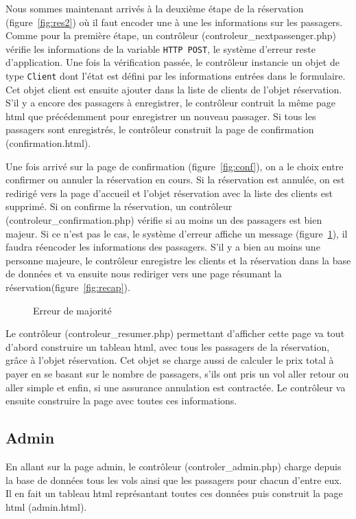 \documentclass[12pt,a4paper]{article}
\begin{document}
			Nous sommes maintenant arrivés à la deuxième étape de la réservation (figure~\ref{fig:res2}) où il faut encoder une à une les informations sur les passagers. Comme pour la première étape, un contrôleur (controleur\_nextpassenger.php) vérifie les informations de la variable \texttt{HTTP POST}, le système d'erreur reste d'application. Une fois la vérification passée, le contrôleur instancie un objet de type \texttt{Client} dont l'état est défini par les informations entrées dans le formulaire. Cet objet client est ensuite ajouter dans la liste de clients de l'objet réservation. S'il y a encore des passagers à enregistrer, le contrôleur contruit la même page html que précédemment pour enregistrer un nouveau passager. Si tous les passagers sont enregistrés, le contrôleur construit la page de confirmation (confirmation.html).

			Une fois arrivé sur la page de confirmation (figure~\ref{fig:conf}), on a le choix entre confirmer ou annuler la réservation en cours. Si la réservation est annulée, on est redirigé vers la page d'accueil et l'objet réservation avec la liste des clients est supprimé. Si on confirme la réservation, un contrôleur (controleur\_confirmation.php) vérifie si au moins un des passagers est bien majeur. Si ce n'est pas le cas, le système d'erreur affiche un message (figure~\ref{fig:ageError}), il faudra réencoder les informations des passagers. S'il y a bien au moins une personne majeure, le contrôleur enregistre les clients et la réservation dans la base de données et va ensuite nous rediriger vers une page résumant la réservation(figure~\ref{fig:recap}).

			\begin{figure}
				\caption{Erreur de majorité}
				\label{fig:ageError}
			\end{figure}

			Le contrôleur (controleur\_resumer.php) permettant d'afficher cette page va tout d'abord construire un tableau html, avec tous les passagers  de la réservation, grâce à l'objet réservation. Cet objet se charge aussi de calculer le prix total à payer en se basant sur le nombre de passagers, s'ils ont pris un vol aller retour ou aller simple et enfin, si une assurance annulation est contractée. Le contrôleur va ensuite construire la page avec toutes ces informations.

		\subsection{Admin}
			En allant sur la page admin, le contrôleur (controler\_admin.php) charge depuis la base de données tous les vols ainsi que les passagers pour chacun d'entre eux. Il en fait un tableau html représantant toutes ces données puis construit la page html (admin.html).
\end{document}
